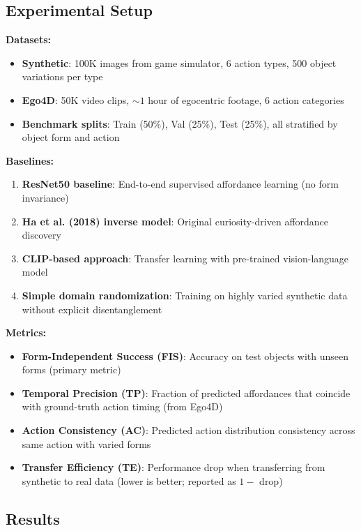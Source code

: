 \documentclass[11pt]{article}
\begin{document}
\subsection{Experimental Setup}

\textbf{Datasets:}
\begin{itemize}
    \item \textbf{Synthetic}: 100K images from game simulator, 6 action types, 500 object variations per type
    \item \textbf{Ego4D}: 50K video clips, $\sim 1$ hour of egocentric footage, 6 action categories
    \item \textbf{Benchmark splits}: Train (50\%), Val (25\%), Test (25\%), all stratified by object form and action
\end{itemize}

\textbf{Baselines:}
\begin{enumerate}
    \item \textbf{ResNet50 baseline}: End-to-end supervised affordance learning (no form invariance)
    \item \textbf{Ha et al. (2018) inverse model}: Original curiosity-driven affordance discovery
    \item \textbf{CLIP-based approach}: Transfer learning with pre-trained vision-language model
    \item \textbf{Simple domain randomization}: Training on highly varied synthetic data without explicit disentanglement
\end{enumerate}

\textbf{Metrics:}
\begin{itemize}
    \item \textbf{Form-Independent Success (FIS)}: Accuracy on test objects with unseen forms (primary metric)
    \item \textbf{Temporal Precision (TP)}: Fraction of predicted affordances that coincide with ground-truth action timing (from Ego4D)
    \item \textbf{Action Consistency (AC)}: Predicted action distribution consistency across same action with varied forms
    \item \textbf{Transfer Efficiency (TE)}: Performance drop when transferring from synthetic to real data (lower is better; reported as $1 -$ drop)
\end{itemize}

\subsection{Results}
\end{document}
